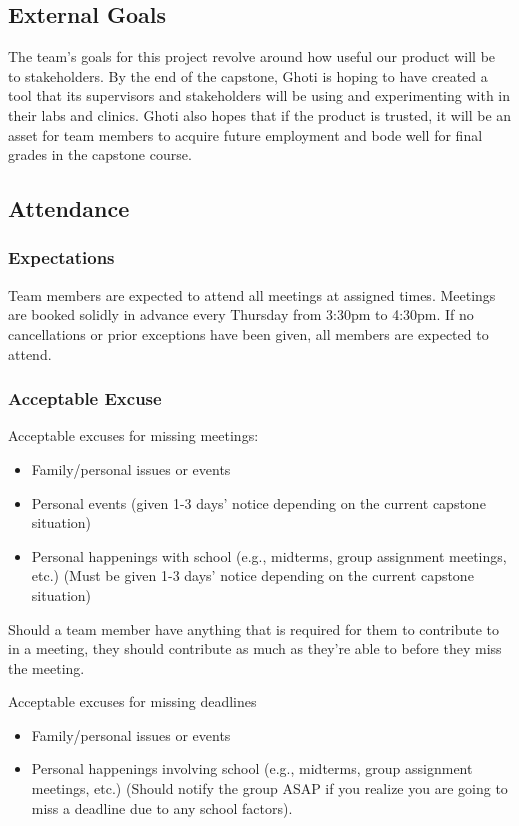 \documentclass{article}
\begin{document}
\subsection*{External Goals}

The team's goals for this project revolve around how useful our product will be to stakeholders. By the end of the capstone, Ghoti is hoping to have created a tool that its supervisors and stakeholders will be using and experimenting with in their labs and clinics. Ghoti also hopes that if the product is trusted, it will be an asset for team members to acquire future employment and bode well for final grades in the capstone course. 

\subsection*{Attendance}

\subsubsection*{Expectations}

Team members are expected to attend all meetings at assigned times. Meetings are booked solidly in advance every Thursday from 3:30pm to 4:30pm. If no cancellations or prior exceptions have been given, all members are expected to attend. 

\subsubsection*{Acceptable Excuse}

Acceptable excuses for missing meetings: 

\begin{itemize}
  \item Family/personal issues or events 
  \item Personal events (given 1-3 days' notice depending on the current capstone situation) 
  \item Personal happenings with school (e.g., midterms, group assignment meetings, etc.) (Must be given 1-3 days' notice depending on the current capstone situation)
\end{itemize}

Should a team member have anything that is required for them to contribute to in a meeting, they should contribute as much as they're able to before they miss the meeting. 

Acceptable excuses for missing deadlines 
\begin{itemize}
  \item Family/personal issues or events 
  \item Personal happenings involving school (e.g., midterms, group assignment meetings, etc.) (Should notify the group ASAP if you realize you are going to miss a deadline due to any school factors). 
\end{itemize}
\end{document}
